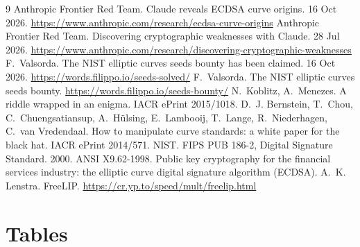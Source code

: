 \documentclass[11pt]{article}
\begin{document}
\begin{thebibliography}{9}
 Anthropic Frontier Red Team. Claude reveals ECDSA curve origins. 16 Oct 2026. \url{https://www.anthropic.com/research/ecdsa-curve-origins}
 Anthropic Frontier Red Team. Discovering cryptographic weaknesses with Claude. 28 Jul 2026. \url{https://www.anthropic.com/research/discovering-cryptographic-weaknesses}
 F.~Valsorda. The NIST elliptic curves seeds bounty has been claimed. 16 Oct 2026. \url{https://words.filippo.io/seeds-solved/}
 F.~Valsorda. The NIST elliptic curves seeds bounty. \url{https://words.filippo.io/seeds-bounty/}
 N.~Koblitz, A.~Menezes. A riddle wrapped in an enigma. IACR ePrint 2015/1018.
 D.~J. Bernstein, T.~Chou, C.~Chuengsatiansup, A.~H\"ulsing, E.~Lambooij, T.~Lange, R.~Niederhagen, C.~van Vredendaal. How to manipulate curve standards: a white paper for the black hat. IACR ePrint 2014/571.
 NIST. FIPS PUB 186-2, Digital Signature Standard. 2000.
 ANSI X9.62-1998. Public key cryptography for the financial services industry: the elliptic curve digital signature algorithm (ECDSA).
 A.~K. Lenstra. FreeLIP. \url{https://cr.yp.to/speed/mult/freelip.html}
\end{thebibliography}

\appendix
\section{Tables}\label{app:tables}

\end{document}

